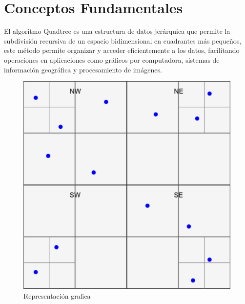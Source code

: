 \documentclass[9pt,a4paper,twoside]{rho-class/rho}
\begin{document}
    \section{ Conceptos Fundamentales }
    El algoritmo Quadtree es una estructura de datos jerárquica que permite la subdivisión recursiva de un espacio bidimensional en cuadrantes más pequeños, este método permite organizar y acceder eficientemente a los datos, facilitando operaciones en aplicaciones como gráficos por computadora, sistemas de información geográfica y procesamiento de imágenes.
    \begin{figure}[h]
        \centering
        \includegraphics[width=\linewidth]{figures/quadtree.pdf}
        \caption{Representación grafica}
        \label{fig:representation_figure}
    \end{figure}\\
\end{document}

